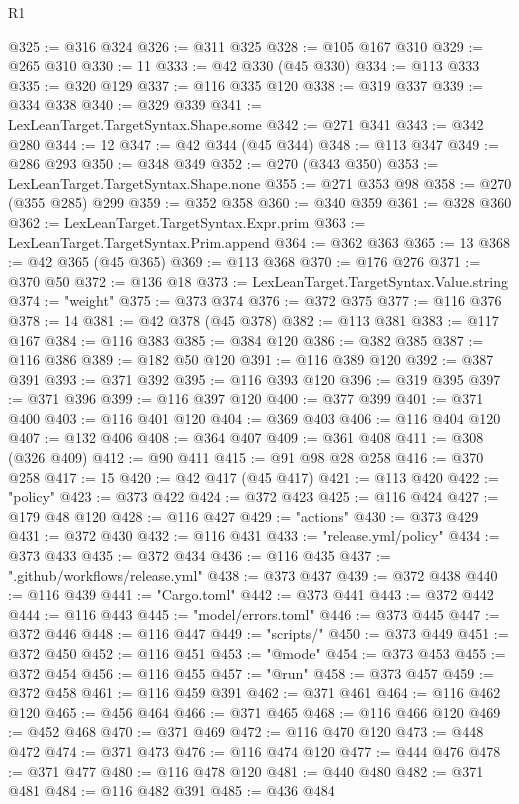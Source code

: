 \begin{lexlean}{R1}
\begin{coremodule}
@325 := @316 @324
@326 := @311 @325
@328 := @105 @167 @310
@329 := @265 @310
@330 := 11
@333 := @42 @330 (@45 @330)
@334 := @113 @333
@335 := @320 @129
@337 := @116 @335 @120
@338 := @319 @337
@339 := @334 @338
@340 := @329 @339
@341 := LexLeanTarget.TargetSyntax.Shape.some
@342 := @271 @341
@343 := @342 @280
@344 := 12
@347 := @42 @344 (@45 @344)
@348 := @113 @347
@349 := @286 @293
@350 := @348 @349
@352 := @270 (@343 @350)
@353 := LexLeanTarget.TargetSyntax.Shape.none
@355 := @271 @353 @98
@358 := @270 (@355 @285) @299
@359 := @352 @358
@360 := @340 @359
@361 := @328 @360
@362 := LexLeanTarget.TargetSyntax.Expr.prim
@363 := LexLeanTarget.TargetSyntax.Prim.append
@364 := @362 @363
@365 := 13
@368 := @42 @365 (@45 @365)
@369 := @113 @368
@370 := @176 @276
@371 := @370 @50
@372 := @136 @18
@373 := LexLeanTarget.TargetSyntax.Value.string
@374 := "weight"
@375 := @373 @374
@376 := @372 @375
@377 := @116 @376
@378 := 14
@381 := @42 @378 (@45 @378)
@382 := @113 @381
@383 := @117 @167
@384 := @116 @383
@385 := @384 @120
@386 := @382 @385
@387 := @116 @386
@389 := @182 @50 @120
@391 := @116 @389 @120
@392 := @387 @391
@393 := @371 @392
@395 := @116 @393 @120
@396 := @319 @395
@397 := @371 @396
@399 := @116 @397 @120
@400 := @377 @399
@401 := @371 @400
@403 := @116 @401 @120
@404 := @369 @403
@406 := @116 @404 @120
@407 := @132 @406
@408 := @364 @407
@409 := @361 @408
@411 := @308 (@326 @409)
@412 := @90 @411
@415 := @91 @98 @28 @258
@416 := @370 @258
@417 := 15
@420 := @42 @417 (@45 @417)
@421 := @113 @420
@422 := "policy"
@423 := @373 @422
@424 := @372 @423
@425 := @116 @424
@427 := @179 @48 @120
@428 := @116 @427
@429 := "actions"
@430 := @373 @429
@431 := @372 @430
@432 := @116 @431
@433 := "release.yml/policy"
@434 := @373 @433
@435 := @372 @434
@436 := @116 @435
@437 := ".github/workflows/release.yml"
@438 := @373 @437
@439 := @372 @438
@440 := @116 @439
@441 := "Cargo.toml"
@442 := @373 @441
@443 := @372 @442
@444 := @116 @443
@445 := "model/errors.toml"
@446 := @373 @445
@447 := @372 @446
@448 := @116 @447
@449 := "scripts/"
@450 := @373 @449
@451 := @372 @450
@452 := @116 @451
@453 := "@mode"
@454 := @373 @453
@455 := @372 @454
@456 := @116 @455
@457 := "@run"
@458 := @373 @457
@459 := @372 @458
@461 := @116 @459 @391
@462 := @371 @461
@464 := @116 @462 @120
@465 := @456 @464
@466 := @371 @465
@468 := @116 @466 @120
@469 := @452 @468
@470 := @371 @469
@472 := @116 @470 @120
@473 := @448 @472
@474 := @371 @473
@476 := @116 @474 @120
@477 := @444 @476
@478 := @371 @477
@480 := @116 @478 @120
@481 := @440 @480
@482 := @371 @481
@484 := @116 @482 @391
@485 := @436 @484

\end{coremodule}
\end{lexlean}
